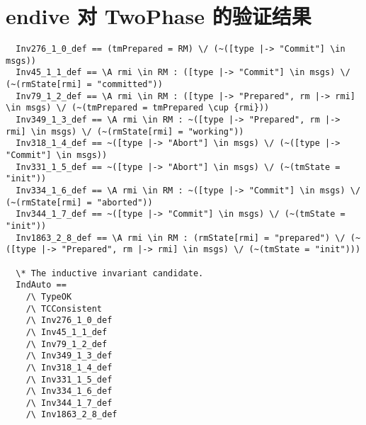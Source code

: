 \appendix
\chapter{endive 对 TwoPhase 的验证结果}\label{app:endive_TwoPhase}
\begin{lstlisting}
  Inv276_1_0_def == (tmPrepared = RM) \/ (~([type |-> "Commit"] \in msgs))
  Inv45_1_1_def == \A rmi \in RM : ([type |-> "Commit"] \in msgs) \/ (~(rmState[rmi] = "committed"))
  Inv79_1_2_def == \A rmi \in RM : ([type |-> "Prepared", rm |-> rmi] \in msgs) \/ (~(tmPrepared = tmPrepared \cup {rmi}))
  Inv349_1_3_def == \A rmi \in RM : ~([type |-> "Prepared", rm |-> rmi] \in msgs) \/ (~(rmState[rmi] = "working"))
  Inv318_1_4_def == ~([type |-> "Abort"] \in msgs) \/ (~([type |-> "Commit"] \in msgs))
  Inv331_1_5_def == ~([type |-> "Abort"] \in msgs) \/ (~(tmState = "init"))
  Inv334_1_6_def == \A rmi \in RM : ~([type |-> "Commit"] \in msgs) \/ (~(rmState[rmi] = "aborted"))
  Inv344_1_7_def == ~([type |-> "Commit"] \in msgs) \/ (~(tmState = "init"))
  Inv1863_2_8_def == \A rmi \in RM : (rmState[rmi] = "prepared") \/ (~([type |-> "Prepared", rm |-> rmi] \in msgs) \/ (~(tmState = "init")))
  
  \* The inductive invariant candidate.
  IndAuto ==
    /\ TypeOK
    /\ TCConsistent
    /\ Inv276_1_0_def
    /\ Inv45_1_1_def
    /\ Inv79_1_2_def
    /\ Inv349_1_3_def
    /\ Inv318_1_4_def
    /\ Inv331_1_5_def
    /\ Inv334_1_6_def
    /\ Inv344_1_7_def
    /\ Inv1863_2_8_def
\end{lstlisting}

